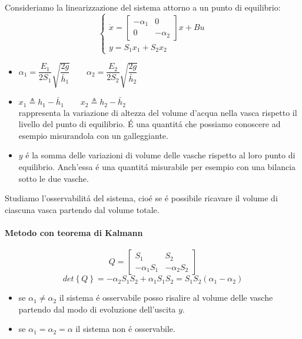 \documentclass[../main.tex]{subfiles}
\begin{document}
		\begin{Exercise}[title={Studiare l'osservabilit\'a di due vasche in parallelo}]
			Consideriamo la linearizzazione del sistema attorno a un punto di equilibrio:
			\[
				\begin{cases}
					\dot x=
					\begin{bmatrix}
						-\alpha_1 & 0\\
						0 & -\alpha_2
					\end{bmatrix} x + Bu	
					\\
					y = S_1 x_1 + S_2 x_2
				\end{cases}
			\]
			\begin{itemize}
				\item 
					$ \alpha_1 = \dfrac{E_1}{2S_1} \sqrt{\dfrac{2g}{\bar h_1}} \qquad \alpha_2 = \dfrac{E_2}{2S_2} \sqrt{\dfrac{2g}{\bar h_2}} $ 
				\item 
					$ x_1 \triangleq h_1 - \bar h_1 \qquad x_2 \triangleq h_2 - \bar h_2 $\\
					rappresenta la variazione di altezza del volume d'acqua nella vasca rispetto il livello del punto di equilibrio. \'E una quantit\'a che possiamo conoscere ad esempio misurandola con un galleggiante.
				\item 
					$ y $ \'e la somma delle variazioni di volume delle vasche rispetto al loro punto di equilibrio. Anch'essa \'e una quantit\'a misurabile per esempio con una bilancia sotto le due vasche. 
			\end{itemize}
		
			Studiamo l'osservabilit\'a del sistema, cio\'e se \'e possibile ricavare il volume di ciascuna vasca partendo dal volume totale.
			
			\paragraph{Metodo con teorema di Kalmann}
				\[
					Q =
					\begin{bmatrix}
						S_1 & S_2\\
						-\alpha_1 S_1 & -\alpha_2 S_2
					\end{bmatrix}
				\]
				\[
					det\left\lbrace Q \right\rbrace = -\alpha_2 S_1 S_2 + \alpha_1 S_1 S_2 = S_1 S_2 (\alpha_1 - \alpha_2)
				\]
				
				\begin{itemize}
					\item 
						se $ \alpha_1 \neq \alpha_2 $ il sistema \'e osservabile posso risalire al volume delle vasche partendo dal modo di evoluzione dell'uscita $ y $.
					\item 
						se $ \alpha_1 = \alpha_2 = \alpha $ il sistema non \'e osservabile.
				\end{itemize}
			

\end{Exercise}
\end{document}
